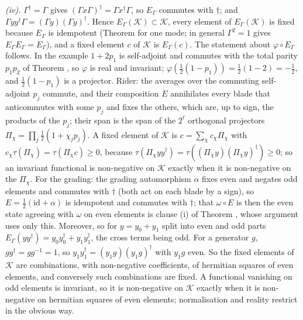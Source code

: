 \emph{(iv).} $\Gamma^{\dagger} = \Gamma$ gives $(\Gamma x\Gamma)^{\dagger} = \Gamma x^{\dagger}\Gamma$, so $E_{\Gamma}$ commutes with $\dagger$; and $\Gamma yy^{\dagger}\Gamma = (\Gamma y)(\Gamma y)^{\dagger}$. Hence $E_{\Gamma}(\mathcal{K}) \subset \mathcal{K}$, every element of $E_{\Gamma}(\mathcal{K})$ is fixed because $E_{\Gamma}$ is idempotent (Theorem  for one mode; in general $\Gamma^{2} = 1$ gives $E_{\Gamma}E_{\Gamma} = E_{\Gamma}$), and a fixed element $c$ of $\mathcal{K}$ is $E_{\Gamma}(c)$. The statement about $\varphi \circ E_{\Gamma}$ follows. In the example $1 + 2p_{1}$ is self-adjoint and commutes with the total parity $p_{1}p_{2}$ of Theorem , so $\varphi$ is real and invariant; $\varphi(\tfrac12(1 - p_{1})) = \tfrac12(1 - 2) = -\tfrac12$, and $\tfrac12(1 - p_{1})$ is a projector. Rider: the averages over the commuting self-adjoint $p_{j}$ commute, and their composition $E$ annihilates every blade that anticommutes with some $p_{j}$ and fixes the others, which are, up to sign, the products of the $p_{j}$; their span is the span of the $2^{\ell}$ orthogonal projectors $\Pi_{\chi} = \prod_{j}\tfrac12(1 + \chi_{j}p_{j})$. A fixed element of $\mathcal{K}$ is $c = \sum_{\chi}c_{\chi}\Pi_{\chi}$ with $c_{\chi}\tau(\Pi_{\chi}) = \tau(\Pi_{\chi}c) \ge 0$, because $\tau(\Pi_{\chi}yy^{\dagger}) = \tau((\Pi_{\chi}y)(\Pi_{\chi}y)^{\dagger}) \ge 0$; so an invariant functional is non-negative on $\mathcal{K}$ exactly when it is non-negative on the $\Pi_{\chi}$. For the grading: the grading automorphism $\alpha$ fixes even and negates odd elements and commutes with $\dagger$ (both act on each blade by a sign), so $E = \tfrac12(\mathrm{id} + \alpha)$ is idempotent and commutes with $\dagger$; that $\omega \circ E$ is then the even state agreeing with $\omega$ on even elements is clause (i) of Theorem , whose argument uses only this. Moreover, so for $y = y_{0} + y_{1}$ split into even and odd parts $E_{\Gamma}(yy^{\dagger}) = y_{0}y_{0}^{\dagger} + y_{1}y_{1}^{\dagger}$, the cross terms being odd. For a generator $g$, $gg^{\dagger} = gg^{-1} = 1$, so $y_{1}y_{1}^{\dagger} = (y_{1}g)(y_{1}g)^{\dagger}$ with $y_{1}g$ even. So the fixed elements of $\mathcal{K}$ are combinations, with non-negative coefficients, of hermitian squares of even elements, and conversely such combinations are fixed. A functional vanishing on odd elements is invariant, so it is non-negative on $\mathcal{K}$ exactly when it is non-negative on hermitian squares of even elements; normalisation and reality restrict in the obvious way.


